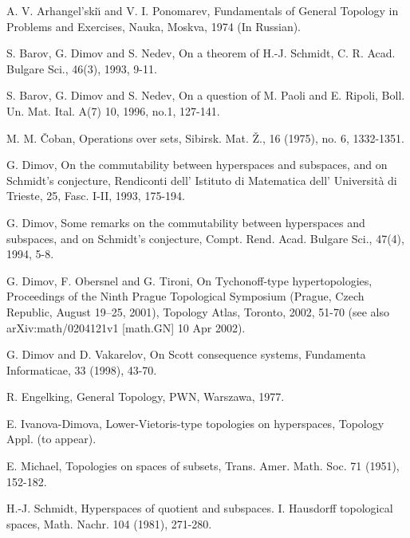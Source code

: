 \documentclass[12pt,draft,leqno]{article}
\begin{document}
\begin{thebibliography}{99}
{\small

A. V. Arhangel'ski\u\i{}  and V. I. Ponomarev,
\newblock Fundamentals of General Topology in Problems and
Exercises,
\newblock Nauka, Moskva, 1974 (In Russian).

S. Barov, G. Dimov and S. Nedev,
\newblock  On a theorem of H.-J. Schmidt,
\newblock C. R. Acad. Bulgare Sci., 46(3), 1993, 9-11.

S. Barov, G. Dimov and S. Nedev,
\newblock On a question of M. Paoli and E. Ripoli,
\newblock Boll. Un. Mat. Ital. A(7) 10, 1996, no.1, 127-141.

 M. M. \v{C}oban,
\newblock  Operations over sets,
\newblock Sibirsk. Mat. \v{Z}., 16 (1975), no. 6, 1332-1351.

G. Dimov,
\newblock On the commutability between hyperspaces and subspaces, and on Schmidt's conjecture,
\newblock Rendiconti dell' Istituto di Matematica dell' Universit\`{a} di Trieste, 25, Fasc. I-II, 1993, 175-194.

G. Dimov,
\newblock Some remarks on the commutability between hyperspaces and subspaces, and on Schmidt's conjecture,
\newblock Compt. Rend. Acad. Bulgare Sci., 47(4), 1994, 5-8.

G. Dimov, F. Obersnel and G. Tironi,
\newblock On Tychonoff-type hypertopologies,
\newblock Proceedings of the Ninth Prague Topological Symposium (Prague, Czech Republic, August 19--25, 2001), Topology Atlas, Toronto, 2002, 51-70
 (see also arXiv:math/0204121v1 [math.GN] 10 Apr 2002).

G. Dimov and D. Vakarelov,
\newblock On Scott consequence systems,
\newblock Fundamenta Informaticae, 33 (1998), 43-70.


 R. Engelking,
\newblock  General Topology,
\newblock PWN, Warszawa, 1977.


E. Ivanova-Dimova,
\newblock Lower-Vietoris-type topologies on hyperspaces,
\newblock Topology Appl. (to appear).

E. Michael,
\newblock  Topologies on spaces of subsets,
\newblock Trans. Amer. Math. Soc. 71 (1951), 152-182.



H.-J. Schmidt,
\newblock Hyperspaces of quotient and subspaces. I. Hausdorff topological spaces,
\newblock Math. Nachr. 104 (1981), 271-280.



}
\end{thebibliography}
\end{document}
